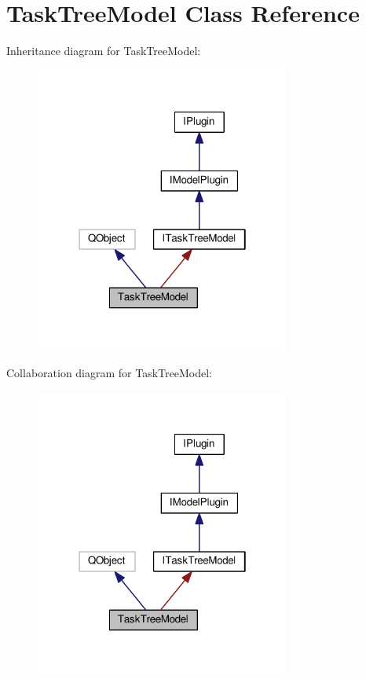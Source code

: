 \hypertarget{class_task_tree_model}{}\section{Task\+Tree\+Model Class Reference}
\label{class_task_tree_model}


Inheritance diagram for Task\+Tree\+Model\+:\nopagebreak
\begin{figure}[H]
\begin{center}
\leavevmode
\includegraphics[width=238pt]{class_task_tree_model__inherit__graph}
\end{center}
\end{figure}


Collaboration diagram for Task\+Tree\+Model\+:\nopagebreak
\begin{figure}[H]
\begin{center}
\leavevmode
\includegraphics[width=238pt]{class_task_tree_model__coll__graph}
\end{center}
\end{figure}
